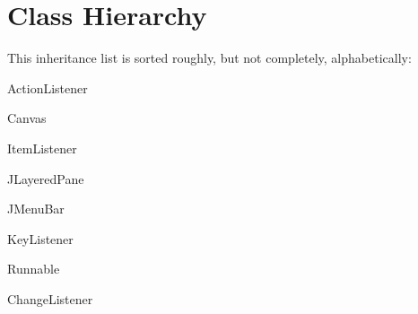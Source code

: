 \section{Class Hierarchy}
This inheritance list is sorted roughly, but not completely, alphabetically\+:\begin{DoxyCompactList}
\item Action\+Listener\begin{DoxyCompactList}
\item {}
\item {}
\end{DoxyCompactList}
\item Canvas\begin{DoxyCompactList}
\item {}
\end{DoxyCompactList}
\item Item\+Listener\begin{DoxyCompactList}
\item {}
\item {}
\end{DoxyCompactList}
\item J\+Layered\+Pane\begin{DoxyCompactList}
\item {}
\end{DoxyCompactList}
\item J\+Menu\+Bar\begin{DoxyCompactList}
\item {}
\end{DoxyCompactList}
\item Key\+Listener\begin{DoxyCompactList}
\item {}
\end{DoxyCompactList}
\item Runnable\begin{DoxyCompactList}
\item {}
\item {}
\item {}
\item {}
\end{DoxyCompactList}
\item Change\+Listener\begin{DoxyCompactList}
\item {}
\end{DoxyCompactList}
\end{DoxyCompactList}
